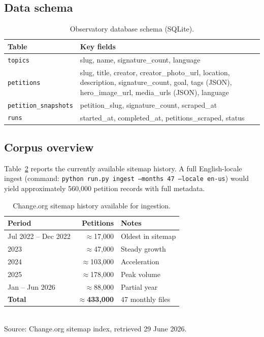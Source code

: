 \documentclass[a4paper, justified, notoc, nobib]{tufte-handout}
\begin{document}
\subsection{Data schema}

\begin{table}[h]
  \caption{Observatory database schema (SQLite).}
  \label{tab:schema}
  \small
  \begin{tabular}{lp{5.5cm}}
    \toprule
    Table & Key fields \\
    \midrule
    \texttt{topics}   & slug, name, signature\_count, language \\
    \texttt{petitions} & slug, title, creator, creator\_photo\_url, location,
                         description, signature\_count, goal, tags (JSON),
                         hero\_image\_url, media\_urls (JSON), language \\
    \texttt{petition\_snapshots} & petition\_slug, signature\_count, scraped\_at \\
    \texttt{runs}     & started\_at, completed\_at, petitions\_scraped, status \\
    \bottomrule
  \end{tabular}
\end{table}

\subsection{Corpus overview}

Table~\ref{tab:corpus} reports the currently available sitemap history.
A full English-locale ingest (command: \texttt{python run.py ingest
--months 47 --locale en-us}) would yield approximately 560,000 petition
records with full metadata.

\begin{table}[h]
  \caption{Change.org sitemap history available for ingestion.}
  \label{tab:corpus}
  \small
  \begin{tabular}{lrl}
    \toprule
    Period & Petitions & Notes \\
    \midrule
    Jul 2022 -- Dec 2022 & $\approx$17,000  & Oldest in sitemap \\
    2023                  & $\approx$47,000  & Steady growth \\
    2024                  & $\approx$103,000 & Acceleration \\
    2025                  & $\approx$178,000 & Peak volume \\
    Jan -- Jun 2026       & $\approx$88,000  & Partial year \\
    \midrule
    \textbf{Total}        & $\approx$\textbf{433,000} & 47 monthly files \\
    \bottomrule
  \end{tabular}
  \smallskip\\
  \footnotesize Source: Change.org sitemap index, retrieved 29 June 2026.
\end{table}
\end{document}
